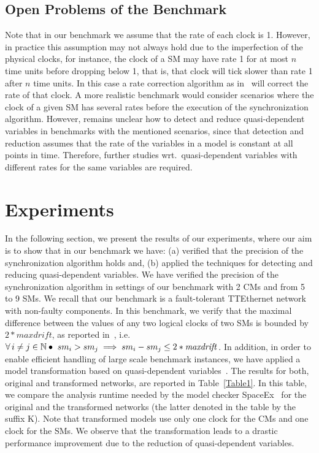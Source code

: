 \subsection{Open Problems of the Benchmark}
Note that in our benchmark we assume that the rate of each clock is 1. However, in practice this assumption
may not always hold due to the imperfection of the physical clocks, for instance, the clock of a SM may have 
rate 1 for at most $n$ time units before dropping below 1, that is, that clock will tick slower than rate 1 after $n$ time units.
In this case a rate correction algorithm as in~\cite{Steiner3} will correct the rate of that clock. 
A more realistic benchmark would consider scenarios where the clock of a given SM has several rates before the execution
of the synchronization algorithm. However, remains unclear how to detect and reduce quasi-dependent variables in benchmarks with
the mentioned scenarios, since that detection and reduction assumes that the rate of the variables in a model is constant at all points in time. Therefore, further studies wrt.\ quasi-dependent variables with different rates for the same variables are required.      
 
\section{Experiments}
In the following section, we present the results of our experiments, where our aim is to show that
in our benchmark we have: (a) verified that the precision of the synchronization algorithm holds and, 
(b) applied the techniques for detecting and reducing quasi-dependent variables. 
We have verified the precision of the synchronization algorithm in settings of our benchmark with 2 CMs and from 5 to 9 SMs. 
We recall that our benchmark is a fault-tolerant TTEthernet network with non-faulty components. 
In this benchmark, we verify that the maximal difference between the values of any two logical clocks of two SMs is bounded by 
$2*\mathit{maxdrift}$, as reported in~\cite{Steiner2}, 
i.e.\ $\forall i\neq j\in\nat\bullet \ sm_i > sm_j \implies sm_i-sm_j \leq 2*\mathit{maxdrift} $.
%
In addition, in order to enable efficient handling of large scale
benchmark instances, we have applied a model transformation based on
quasi-dependent variables~\cite{Herrera3}. 
%
The results for both, original and transformed networks, are reported in 
Table~\ref{Table1}. In this table, we compare the analysis runtime needed by the model checker 
SpaceEx~\cite{Frehse,bogomolov-et-al-sttt2015,DBLP:conf/hvc/BogomolovFGGPPS14}
 for the original and the transformed networks (the latter denoted in the table by the suffix K). 
Note that transformed models use only one clock for the CMs and one clock for the SMs.
%
We observe that the transformation leads to a drastic performance improvement due to the reduction of quasi-dependent variables.   

